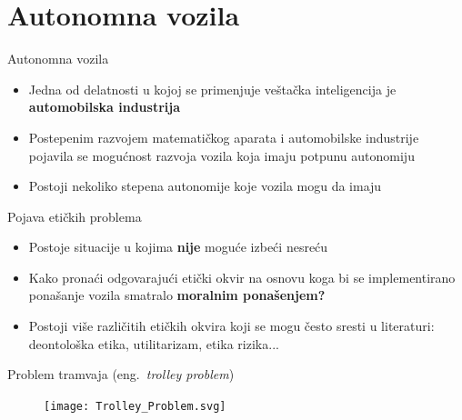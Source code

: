 \documentclass[14pt, aspectratio=169]{beamer}
\begin{document}
\section{Autonomna vozila}

\begin{frame}{Autonomna vozila}
    \begin{itemize}
        \item Jedna od delatnosti u kojoj se primenjuje veštačka inteligencija je \textbf{automobilska industrija}
    \end{itemize}
    \begin{itemize}
        \item Postepenim razvojem matematičkog aparata i automobilske industrije pojavila se mogućnost razvoja vozila koja imaju potpunu autonomiju
    \end{itemize}
    \begin{itemize}
        \item Postoji nekoliko stepena autonomije koje vozila mogu da imaju
    \end{itemize}
\end{frame}

\begin{frame}{Pojava etičkih problema}
    \begin{itemize}
        \item Postoje situacije u kojima \textbf{nije} moguće izbeći nesreću
    \end{itemize}
    \begin{itemize}
        \item Kako pronaći odgovarajući etički okvir na osnovu koga bi se implementirano ponašanje vozila smatralo \textbf{moralnim ponašenjem? }
    \end{itemize}
    \begin{itemize}
        \item Postoji više različitih etičkih okvira koji se mogu često sresti u literaturi: deontološka etika, utilitarizam, etika rizika...
    \end{itemize}
\end{frame}

\begin{frame}{Problem tramvaja (eng.~{\em trolley problem})}
   \begin{figure}[h!]
        \begin{center}
            \texttt{[image: Trolley\_Problem.svg]}
        \end{center}
        \label{fig:minAI}
    \end{figure}
\end{frame}
\end{document}
